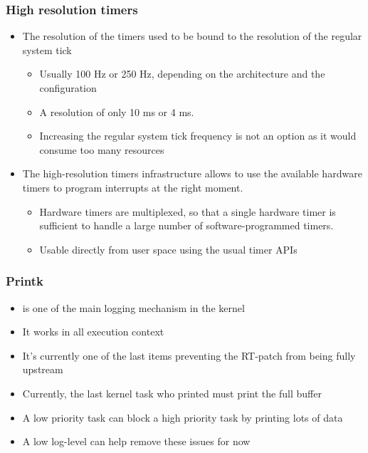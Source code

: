 \begin{frame}
  \frametitle{High resolution timers}
  \begin{itemize}
  \item The resolution of the timers used to be bound to the
    resolution of the regular system tick
    \begin{itemize}
    \item Usually 100 Hz or 250 Hz, depending on the architecture and
      the configuration
    \item A resolution of only 10 ms or 4 ms.
    \item Increasing the regular system tick frequency is not an
      option as it would consume too many resources
    \end{itemize}
  \item The high-resolution timers infrastructure allows to use
    the available hardware timers to program interrupts
    at the right moment.
    \begin{itemize}
    \item Hardware timers are multiplexed, so that a single hardware
      timer is sufficient to handle a large number of
      software-programmed timers.
    \item Usable directly from user space using the usual timer APIs
    \end{itemize}
  \end{itemize}
\end{frame}

\begin{frame}
  \frametitle{Printk}
        \begin{itemize}
                \item {} is one of the main logging mechanism in the kernel
                \item It works in all execution context
                \item It's currently one of the last items preventing the RT-patch from being fully upstream
                \item Currently, the last kernel task who printed must print the full buffer
                \item A low priority task can block a high priority task by printing lots of data
                \item A low log-level can help remove these issues for now
        \end{itemize}
\end{frame}

